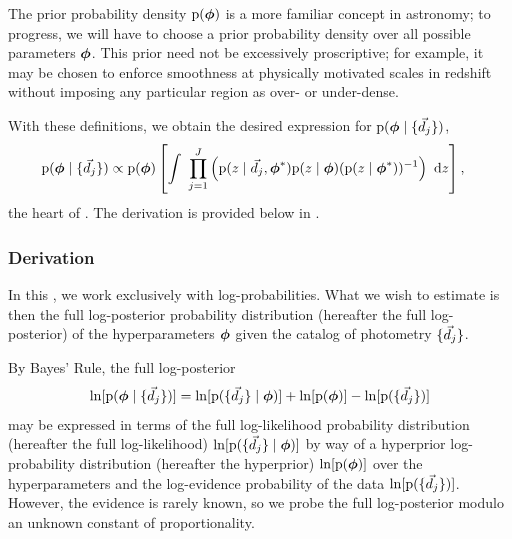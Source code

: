 The prior probability density $\mathrm{p}({\boldsymbol{\phi}})$ is a more familiar concept in astronomy; to progress, we will have to choose a prior probability density over all possible parameters ${\boldsymbol{\phi}}$.
This prior need not be excessively proscriptive; for example, it may be chosen to enforce smoothness at physically motivated scales in redshift without imposing any particular region as over- or under-dense.

With these definitions, we obtain the desired expression for $\mathrm{p}({\boldsymbol{\phi}} \mid \{\vec{d}_{j}\})$,
\begin{align}
\begin{split}
\eqlabel{eqn:fullunlogpost}
\pr{\ndphi \gvn \{\data_{j}\}} & \propto \pr{\ndphi}\left[\integral{\prod_{j=1}^{J} \left(\pr{z \gvn \data_{j}, \ndphi^{*}}\pr{z \gvn \ndphi}(\pr{z \gvn \ndphi^{*}})^{-1}\right)}{z}\right] ,
\end{split}
\end{align}
the heart of \Chippr.
The derivation is provided below in .

\subsubsection{Derivation}


In this \paper, we work exclusively with log-probabilities.  
What we wish to estimate is then the full log-posterior probability distribution (hereafter the full log-posterior) of the hyperparameters ${\boldsymbol{\phi}}$ given the catalog of photometry $\{\vec{d}_{j}\}$.

By Bayes' Rule, the full log-posterior
\begin{equation}
\eqlabel{eq:basicbayes}
\ln[\pr{\ndphi \gvn \{\data_{j}\}}] = \ln[\pr{\{\data_{j}\} \gvn \ndphi}] + \ln[\pr{\ndphi}] - \ln[\pr{\{\data_{j}\}}]
\end{equation}
may be expressed in terms of the full log-likelihood probability distribution (hereafter the full log-likelihood) $\ln[\mathrm{p}(\{\vec{d}_{j}\} \mid {\ensuremath{\boldsymbol{\phi}}})]$ by way of a hyperprior log-probability distribution (hereafter the hyperprior) $\ln[\mathrm{p}({\boldsymbol{\phi}})]$ over the hyperparameters and the log-evidence probability of the data $\ln[\mathrm{p}(\{\vec{d}_{j}\})]$.
However, the evidence is rarely known, so we probe the full log-posterior modulo an unknown constant of proportionality.

